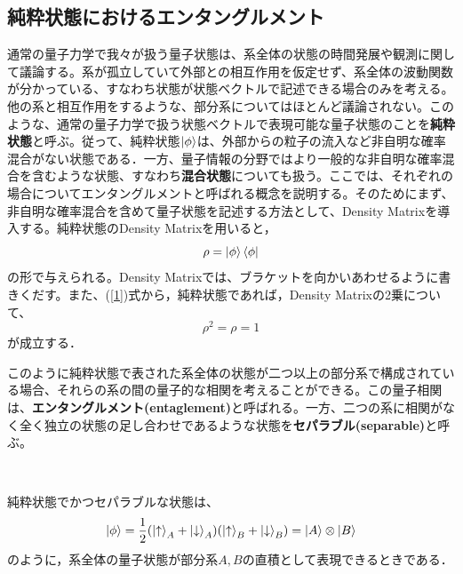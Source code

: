 \subsection{純粋状態におけるエンタングルメント}
通常の量子力学で我々が扱う量子状態は、系全体の状態の時間発展や観測に関して議論する。系が孤立していて外部との相互作用を仮定せず、系全体の波動関数が分かっている、すなわち状態が状態ベクトルで記述できる場合のみを考える。他の系と相互作用をするような、部分系についてはほとんど議論されない。このような、通常の量子力学で扱う状態ベクトルで表現可能な量子状態のことを{\bf 純粋状態}と呼ぶ。従って、純粋状態$\ket{\phi}$は、外部からの粒子の流入など非自明な確率混合がない状態である．一方、量子情報の分野ではより一般的な非自明な確率混合を含むような状態、すなわち{\bf 混合状態}についても扱う。ここでは、それぞれの場合についてエンタングルメントと呼ばれる概念を説明する。そのためにまず、非自明な確率混合を含めて量子状態を記述する方法として、Density Matrixを導入する。純粋状態のDensity Matrixを用いると，
\begin{equation}
\label{1}
\rho=\ket{\phi}\bra{\phi}
\end{equation}
の形で与えられる。Density Matrixでは、ブラケットを向かいあわせるように書きくだす。また、(\ref{1})式から，純粋状態であれば，Density Matrixの2乗について、
\begin{equation}
\label{2}
\rho^{2}=\rho=1
\end{equation}
が成立する．

このように純粋状態で表された系全体の状態が二つ以上の部分系で構成されている場合、それらの系の間の量子的な相関を考えることができる。この量子相関は、{\bf エンタングルメント(entaglement)}と呼ばれる。一方、二つの系に相関がなく全く独立の状態の足し合わせであるような状態を{\bf セパラブル(separable)}と呼ぶ。
\
\

\begin{empheqboxed}
  \
  \

純粋状態でかつセパラブルな状態は、
  \begin{equation}
    \label{3}
  \ket{\phi}=\frac{1}{2}(\ket{\uparrow}_{A}+\ket{\downarrow}_{A})(\ket{\uparrow}_{B} +\ket{\downarrow}_{B})=\ket{A}\otimes\ket{B}
  \end{equation}
のように，系全体の量子状態が部分系$A,B$の直積として表現できるときである．
\

\end{empheqboxed}



